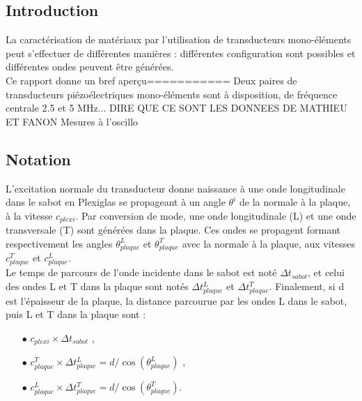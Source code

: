 \documentclass[twoside]{article}
\begin{document}
\begin{multicols}{2} %

\section{Introduction}
La caractérisation de matériaux par l'utilisation de transducteurs mono-éléments peut s'effectuer de différentes manières : différentes configuration sont possibles et différentes ondes peuvent être générées.\\

Ce rapport donne un bref aperçu===========
Deux paires de transducteurs piézoélectriques mono-éléments sont à disposition, de fréquence centrale 2.5 et 5 MHz...
DIRE QUE CE SONT LES DONNEES DE MATHIEU ET FANON	
Mesures à l'oscillo	
\subsection*{Notation}

L'excitation normale du transducteur donne naissance à une onde longitudinale dans le sabot en Plexiglas se propageant à un angle $\theta^{i}$ de la normale à la plaque, à la vitesse $c_{plexi}$. Par conversion de mode, une onde longitudinale (L) et une onde transversale (T) sont générées dans la plaque. Ces ondes se propagent formant respectivement les angles $\theta_{plaque}^L$ et $\theta_{plaque}^T$ avec la normale à la plaque, aux vitesses $c_{plaque}^T$ et $c_{plaque}^L$.\\

Le temps de parcours de l'onde incidente dans le sabot est noté $\Delta t_{sabot}$, et celui des ondes L et T dans la plaque sont notés $\Delta t_{plaque}^L$ et $\Delta t_{plaque}^T$. Finalement, si d est l'épaisseur de la plaque, la distance parcourue par les ondes L dans le sabot, puis L et T dans la plaque sont : 
\begin{itemize}
	\item[$\bullet$] $c_{plexi} \times \Delta t_{sabot}$ , \\
	\item[$\bullet$] $c_{plaque}^T \times \Delta t_{plaque}^L = d/\cos(\theta_{plaque}^L)$ , \\
	\item[$\bullet$] $c_{plaque}^L \times \Delta t_{plaque}^T = d/\cos(\theta_{plaque}^T)$.
\end{itemize}


\end{multicols}
\end{document}

